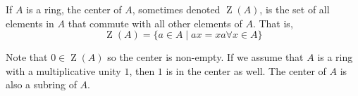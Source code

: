 \documentclass[12pt]{article}
\begin{document}
If $A$ is a ring, the center of $A$, sometimes denoted $\operatorname{Z}(A)$, is the set of all elements in $A$ that commute with all other elements of $A$. That is,
$$\operatorname{Z}(A) = \{ a \in A \mid ax = xa \text{} \forall x \in A \}$$

Note that $0 \in \operatorname{Z}(A)$ so the center is non-empty. If we assume that $A$ is a ring with a multiplicative unity $1$, then $1$ is in the center as well. The center of $A$ is also a subring of $A$.
\end{document}
